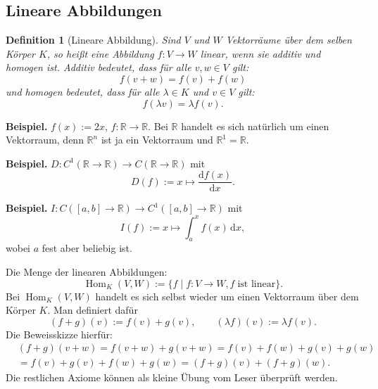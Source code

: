\documentclass[a4paper,11pt,fleqn,twoside]{scrartcl}
\numberwithin{equation}{section}
\newcommand{\R}{\mathbb R}
\newcommand{\strong}[1]{{\normalfont\sffamily\bfseries #1}}
\theoremstyle{rmbox}
\newtheorem{Definition}{Definition}
\begin{document}
\subsection{Lineare Abbildungen}

\begin{Definition}[Lineare Abbildung]
Sind $V$ und $W$ Vektorräume über dem selben Körper $K$, so heißt
eine Abbildung $f\colon V\to W$ \emph{linear}, wenn sie additiv
und homogen ist. \emph{Additiv} bedeutet, dass für alle $v,w\in V$
gilt:
\begin{equation}
f(v+w) = f(v)+f(w)
\end{equation}
und \emph{homogen} bedeutet, dass für alle $\lambda\in K$ und $v\in V$
gilt:
\begin{equation}
f(\lambda v) = \lambda f(v).
\end{equation}
\end{Definition}

\strong{Beispiel.} $f(x):=2x$, $f\colon\R\to\R$. Bei $\R$ handelt
es sich natürlich um einen Vektorraum, denn $\R^n$ ist ja ein
Vektorraum und $\R^1=\R$.

\strong{Beispiel.} $D\colon C^1(\R\to\R)\to C(\R\to\R)$ mit
\begin{equation}
D(f):=x\mapsto\frac{\mathrm df(x)}{\mathrm dx}.
\end{equation}

\strong{Beispiel.} $I\colon C([a,b]\to\R)\to C^1([a,b]\to\R)$ mit
\begin{equation}
I(f):=x\mapsto\int_a^x f(x)\,\mathrm dx,
\end{equation}
wobei $a$ fest aber beliebig ist.

Die Menge der linearen Abbildungen:
\begin{equation}
\operatorname{Hom}_K(V,W)
:= \{f\mid f\colon V\to W, f\;\text{ist linear}\}.
\end{equation}
Bei $\operatorname{Hom}_K(V,W)$ handelt es sich selbst wieder
um einen Vektorraum über dem Körper $K$. Man definiert dafür
\begin{equation}
(f+g)(v) := f(v)+g(v),\qquad
(\lambda f)(v) := \lambda f(v).
\end{equation}
Die Beweisskizze hierfür:
\[\begin{split}
&(f+g)(v+w) = f(v+w)+g(v+w) = f(v)+f(w)+g(v)+g(w)\\
&= f(v)+g(v)+f(w)+g(w) = (f+g)(v)+(f+g)(w).
\end{split}\]
Die restlichen Axiome können als kleine Übung vom Leser
überprüft werden.
\end{document}
